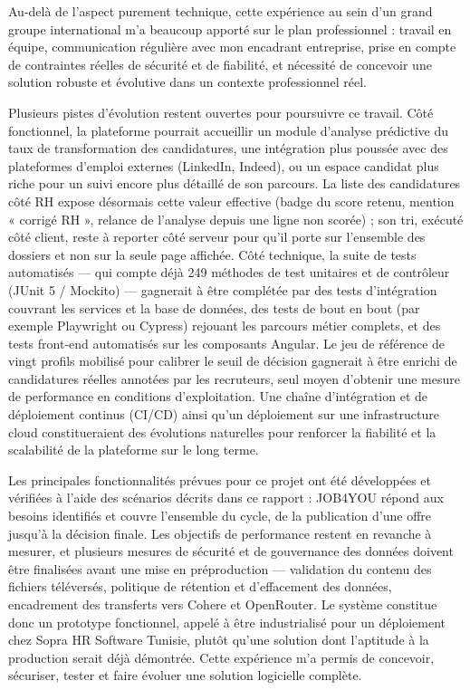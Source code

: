 Au-delà de l’aspect purement technique, cette expérience au sein d’un grand groupe international m’a beaucoup apporté sur le plan professionnel : travail en équipe, communication régulière avec mon encadrant entreprise, prise en compte de contraintes réelles de sécurité et de fiabilité, et nécessité de concevoir une solution robuste et évolutive dans un contexte professionnel réel.

Plusieurs pistes d’évolution restent ouvertes pour poursuivre ce travail. Côté fonctionnel, la plateforme pourrait accueillir un module d’analyse prédictive du taux de transformation des candidatures, une intégration plus poussée avec des plateformes d’emploi externes (LinkedIn, Indeed), ou un espace candidat plus riche pour un suivi encore plus détaillé de son parcours. La liste des candidatures côté RH expose désormais cette valeur effective (badge du score retenu, mention « corrigé RH », relance de l’analyse depuis une ligne non scorée) ; son tri, exécuté côté client, reste à reporter côté serveur pour qu’il porte sur l’ensemble des dossiers et non sur la seule page affichée. Côté technique, la suite de tests automatisés — qui compte déjà 249 méthodes de test unitaires et de contrôleur (JUnit 5 / Mockito) — gagnerait à être complétée par des tests d’intégration couvrant les services et la base de données, des tests de bout en bout (par exemple Playwright ou Cypress) rejouant les parcours métier complets, et des tests front-end automatisés sur les composants Angular. Le jeu de référence de vingt profils mobilisé pour calibrer le seuil de décision gagnerait à être enrichi de candidatures réelles annotées par les recruteurs, seul moyen d’obtenir une mesure de performance en conditions d’exploitation. Une chaîne d’intégration et de déploiement continus (CI/CD) ainsi qu’un déploiement sur une infrastructure cloud constitueraient des évolutions naturelles pour renforcer la fiabilité et la scalabilité de la plateforme sur le long terme.

Les principales fonctionnalités prévues pour ce projet ont été développées et vérifiées à l’aide des scénarios décrits dans ce rapport : JOB4YOU répond aux besoins identifiés et couvre l’ensemble du cycle, de la publication d’une offre jusqu’à la décision finale. Les objectifs de performance restent en revanche à mesurer, et plusieurs mesures de sécurité et de gouvernance des données doivent être finalisées avant une mise en préproduction — validation du contenu des fichiers téléversés, politique de rétention et d’effacement des données, encadrement des transferts vers Cohere et OpenRouter. Le système constitue donc un prototype fonctionnel, appelé à être industrialisé pour un déploiement chez Sopra HR Software Tunisie, plutôt qu’une solution dont l’aptitude à la production serait déjà démontrée. Cette expérience m’a permis de concevoir, sécuriser, tester et faire évoluer une solution logicielle complète.
